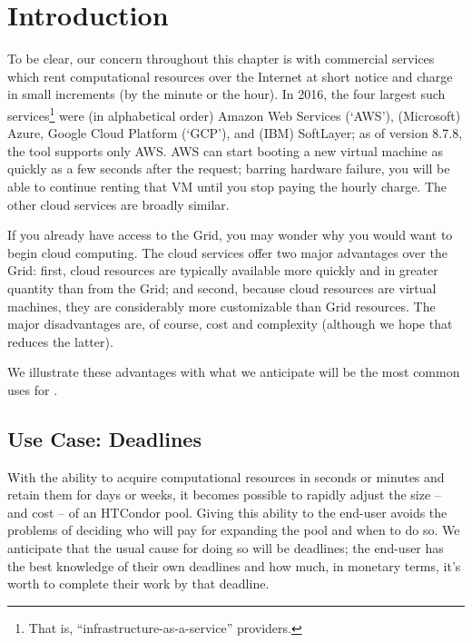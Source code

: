 \section{\label{sec:clouds-introduction}Introduction}

To be clear, our concern throughout this chapter is with commercial services
which rent computational resources over the Internet at short notice and
charge in small increments (by the minute or the hour).  In 2016, the four
largest such services\footnote{That is, ``infrastructure-as-a-service''
providers.} were (in alphabetical order) Amazon Web Services (`AWS'),
(Microsoft) Azure, Google Cloud Platform (`GCP'), and (IBM) SoftLayer; as of
version 8.7.8, the  tool supports only AWS.  AWS can start
booting a new virtual machine as quickly as a few seconds after the request;
barring hardware failure, you will be able to continue renting that VM until
you stop paying the hourly charge.  The other cloud services are broadly
similar.

If you already have access to the Grid, you may wonder why you would want to
begin cloud computing.  The cloud services offer two major advantages over
the Grid: first, cloud resources are typically available more quickly and
in greater quantity than from the Grid; and second, because cloud resources are
virtual machines, they are considerably more customizable than Grid resources.
The major disadvantages are, of course, cost and complexity (although we
hope that  reduces the latter).

We illustrate these advantages with what we anticipate will be the most
common uses for .

\subsection{Use Case: Deadlines}

With the ability to acquire computational resources in seconds or minutes
and retain them for days or weeks, it becomes possible to rapidly adjust
the size -- and cost -- of an HTCondor pool.  Giving this ability to the
end-user avoids the problems of deciding who will pay for expanding the
pool and when to do so.  We anticipate that the usual cause for doing so
will be deadlines; the end-user has the best knowledge of their own
deadlines and how much, in monetary terms, it's worth to complete their
work by that deadline.


